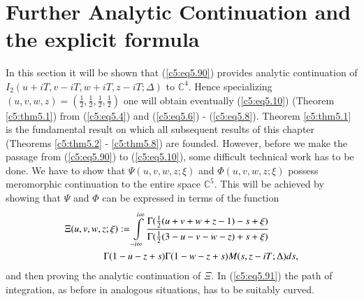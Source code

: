 \section{Further Analytic Continuation and the explicit
  formula}\label{c5:sec5.4} 

In this section it will be shown that (\ref{c5:eq5.90}) provides
analytic continuation of $I_2 (u+iT, v - iT, w + iT, z - iT;\Delta)$
to $\mathbb{C}^4$. Hence specializing $(u,v,w,z) = (\frac{1}{2},
\frac{1}{2}, \frac{1}{2}, \frac{1}{2})$ one will obtain eventually
(\ref{c5:eq5.10}) (Theorem \ref{c5:thm5.1}) from (\ref{c5:eq5.4}) and
(\ref{c5:eq5.6}) - (\ref{c5:eq5.8}). Theorem \ref{c5:thm5.1} is the
fundamental result on which all subsequent results of this chapter
(Theorems \ref{c5:thm5.2} - \ref{c5:thm5.8}) are founded. However,
before we make the passage from (\ref{c5:eq5.90}) to
(\ref{c5:eq5.10}), some difficult technical work has to be done. We
have to show that $\Psi (u,v,w,z;\xi)$ and $\Phi (u,v,w,z;\xi)$
possess meromorphic continuation to the entire space
$\mathbb{C}^5$. This will be achieved by showing  that $\Psi$ and
$\Phi$ can be expressed in terms of the function  
\begin{align}
&\Xi (u,v,w,z;\xi) : =  \int\limits^{i\infty}_{-i\infty} \frac{\Gamma
    (\frac{1}{2} (u+v+w+z-1) - s + \xi)}{\Gamma (\frac{1}{2} (3 - u -
    v - w - z) + s + \xi)}\label{c5:eq5.91}\\ 
& \qquad \qquad  \Gamma (1- u - z + s) \Gamma (1-w-z+s) M (s, z -
  iT;\Delta) ds,\notag  
\end{align}
and then proving the analytic continuation of $\Xi$. In
(\ref{c5:eq5.91}) the path of integration, as before in analogous
situations, has to be suitably curved.\pageoriginale 

